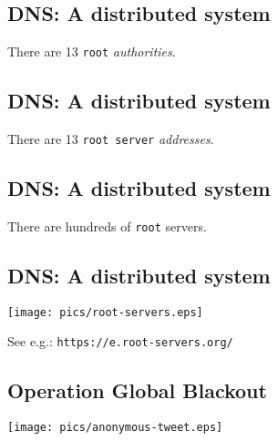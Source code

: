 \documentclass[xga]{xdvislides}
\begin{document}
\subsection{DNS: A distributed system}
\vspace{.5in}
\begin{center}
	\Huge
	There are 13 \verb+root+ {\em authorities}. \\
\end{center}
\Normalsize

\subsection{DNS: A distributed system}
\vspace{.5in}
\begin{center}
	\Huge
	There are 13 \verb+root server+ {\em addresses}. \\
\end{center}
\Normalsize

\subsection{DNS: A distributed system}
\vspace{.5in}
\begin{center}
	\Huge
	There are hundreds of \verb+root+ servers. \\
\end{center}
\Normalsize

\subsection{DNS: A distributed system}
\vspace*{\fill}
\begin{center}
	\texttt{[image: pics/root-servers.eps]}
\end{center}
\vspace*{\fill}
See e.g.: {\tt https://e.root-servers.org/}

\subsection{Operation Global Blackout}
\vspace*{\fill}
\begin{center}
	\texttt{[image: pics/anonymous-tweet.eps]} \\
\end{center}
\vspace*{\fill}
\end{document}
